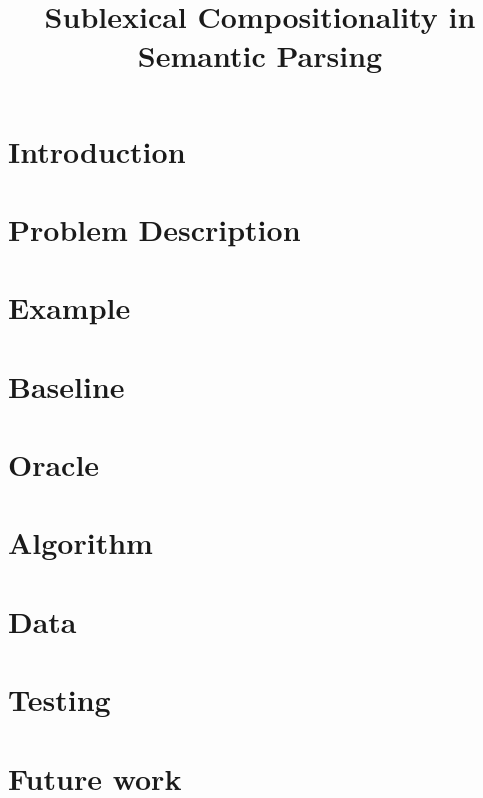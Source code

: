 \documentclass[11pt, a4paper]{article}
\title{Sublexical Compositionality in Semantic Parsing}
\begin{document}
\maketitle

%
\section{Introduction}

\section{Problem Description}


\section{Example}

\section{Baseline}

\section{Oracle}

\section{Algorithm}

\section{Data}

\section{Testing}

\section{Future work}
\end{document}
